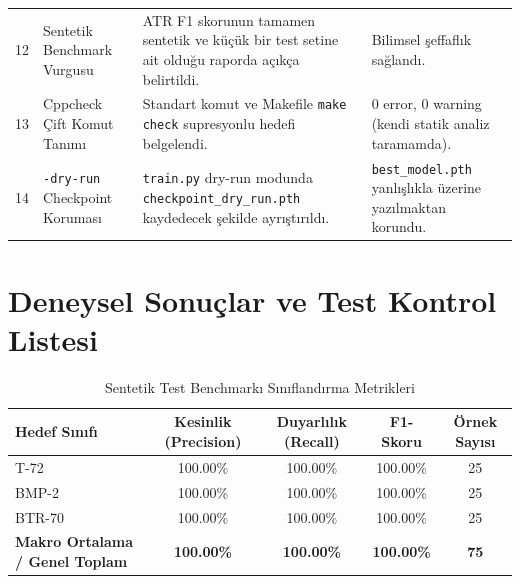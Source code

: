 \documentclass[11pt,a4paper]{article}
\begin{document}
\begin{xltabular}{\textwidth}{c p{3.4cm} p{5.2cm} X}
12 & Sentetik Benchmark Vurgusu & ATR F1 skorunun tamamen sentetik ve küçük bir test setine ait olduğu raporda açıkça belirtildi. & Bilimsel şeffaflık sağlandı. \\
13 & Cppcheck Çift Komut Tanımı & Standart komut ve Makefile \texttt{make check} supresyonlu hedefi belgelendi. & 0 error, 0 warning (kendi statik analiz taramamda). \\
14 & \texttt{-dry-run} Checkpoint Koruması & \texttt{train.py} dry-run modunda \texttt{checkpoint\_}\allowbreak\texttt{dry\_run.pth} kaydedecek şekilde ayrıştırıldı. & \texttt{best\_model.pth} yanlışlıkla üzerine yazılmaktan korundu. \\
\end{xltabular}
\normalsize
\newpage
\section{Deneysel Sonuçlar ve Test Kontrol Listesi}

\begin{table}[htbp]
\centering
\small
\caption{Sentetik Test Benchmarkı Sınıflandırma Metrikleri}
\label{tab:f1_metrics}
\begin{tabularx}{\textwidth}{Xcccc}
\toprule
\textbf{Hedef Sınıfı} & \textbf{Kesinlik (Precision)} & \textbf{Duyarlılık (Recall)} & \textbf{F1-Skoru} & \textbf{Örnek Sayısı} \\
\midrule
T-72 & 100.00\% & 100.00\% & 100.00\% & 25 \\
BMP-2 & 100.00\% & 100.00\% & 100.00\% & 25 \\
BTR-70 & 100.00\% & 100.00\% & 100.00\% & 25 \\
\midrule
\textbf{Makro Ortalama / Genel Toplam} & \textbf{100.00\%} & \textbf{100.00\%} & \textbf{100.00\%} & \textbf{75} \\
\bottomrule
\end{tabularx}
\end{table}
\end{document}
